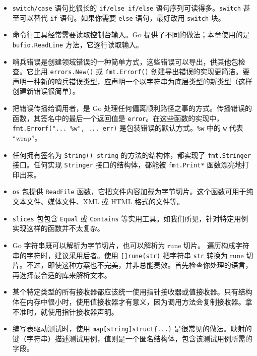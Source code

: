 \begin{itemize}
\item \texttt{switch/case} 语句比很长的 \texttt{if/else if/else} 语句序列可读得多。\texttt{switch}
甚至可以替代 \texttt{if} 语句。如果你需要 \texttt{else} 语句，最好改用 \texttt{switch} 块。

\item 命令行工具经常需要读取控制台输入。Go 提供了不同的做法；本章使用的是 \texttt{bufio.\allowbreak ReadLine} 方法，它逐行读取输入。

\item 哨兵错误是创建领域错误的一种简单方式，这些错误可以导出，供其他包检查。它比用 \texttt{errors.New()} 或 \texttt{fmt.Errorf()} 创建导出错误的实现更简洁。要声明一种新的哨兵错误类型，应声明一个以字符串为底层类型的新类型（这样创建新错误很简单）。

\item 把错误传播给调用者，是 Go 处理任何偏离顺利路径之事的方式。传播错误的函数，其签名中的最后一个返回值是 \texttt{error}。在这些函数的实现中，\texttt{fmt.Errorf("... \%w", ... err)} 是包装错误的默认方式。\texttt{\%w} 中的 \texttt{w} 代表 ``wrap''。

\item 任何拥有签名为 \texttt{String() string} 的方法的结构体，都实现了 \texttt{fmt.Stringer} 接口。任何实现 \texttt{Stringer} 接口的结构体，都能被 \texttt{fmt.Print*} 函数漂亮地打印出来。

\item \texttt{os} 包提供 \texttt{ReadFile} 函数，它把文件内容加载为字节切片。这个函数可用于纯文本文件、媒体文件、XML 或 HTML 格式的文件等。

\item \texttt{slices} 包包含 \texttt{Equal} 或 \texttt{Contains} 等实用工具。如我们所见，针对特定用例实现这样的函数并不太复杂。

\item Go 字符串既可以解析为字节切片，也可以解析为 rune 切片。
遍历构成字符串的字符时，建议采用后者。使用 \texttt{[]rune(str)} 把字符串 \texttt{str} 转换为 rune 切片。不过，即使这种方案也不完美，并非总能奏效。首先检查你处理的语言，再选择最合适的库来解析文本。

\item 某个特定类型的所有接收器都应该统一使用指针接收器或值接收器。只有结构体在内存中很小时，使用值接收器才有意义，因为调用方法会复制接收器。拿不准时，就使用指针接收器声明。

\item 编写表驱动测试时，使用 \texttt{map[string]struct\{...\}} 是很常见的做法。映射的键（字符串）描述测试用例，值则是一个匿名结构体，包含该测试用例所需的字段。


\end{itemize}
